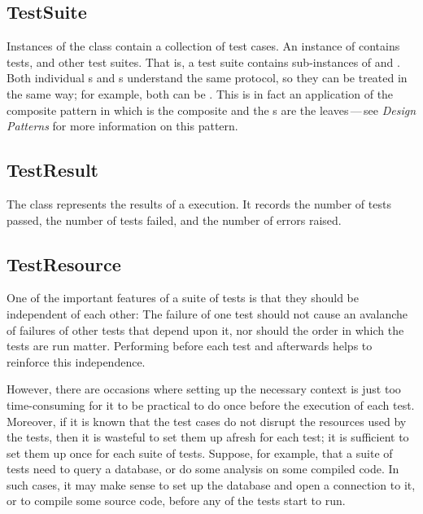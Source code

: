 \documentclass[a4paper,10pt,twoside]{book}
\begin{document}
\subsection{TestSuite}

Instances of the class  contain a collection of test cases.
An instance of  contains tests, and other test suites.
That is, a test suite contains sub-instances of
 and .
Both individual s and s understand the same protocol, so they can be treated in the same way; for example, both can be .
This is in fact an application of the composite pattern in which  is the composite and the s are the leaves\,---\,see \textit{Design Patterns} for more information on this pattern\cite{Gamm95a}.
\subsection{TestResult}

The class  represents the results of a  execution.
It records the number of tests passed, the number of tests failed, and the number of errors raised.

\subsection{TestResource}
\label{sec:resource}

One of the important features of a suite of tests is that they should be independent of each other:
The failure of one test should not cause an avalanche of failures of other tests that depend upon it, nor should the order in which the tests are run matter.
Performing  before each test and  afterwards helps to reinforce this independence. 

However, there are occasions where setting up the necessary context is just too time-consuming for it to be practical to do once before the execution of each test.
Moreover, if it is known that the test cases do not disrupt the resources used by the tests, then it is wasteful to set them up afresh for each test; it is sufficient to set them up once for each suite of tests.
Suppose, for example, that a suite of tests need to query a database, or do some analysis on some compiled code.
In such cases, it may make sense to set up the database and open a connection to it, or to compile some source code, before any of the tests start to run.
\end{document}
